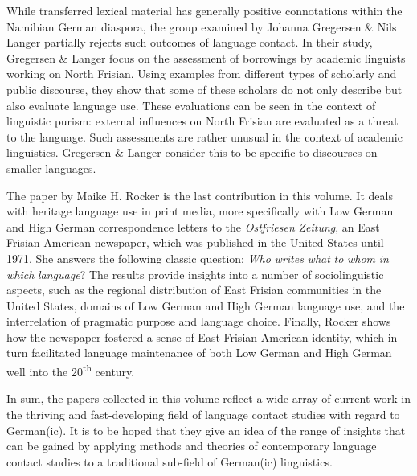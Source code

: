 \documentclass[output=paper]{langsci/langscibook}
\begin{document}
While transferred lexical material has generally positive connotations within the Namibian German diaspora, the group examined by {Johanna} {Gregersen} {\&}  {Nils} {Langer} partially rejects such outcomes of language contact. In their study, Gregersen \& Langer focus on the assessment of borrowings by academic linguists working on North Frisian. Using examples from different types of scholarly and public discourse, they show that some of these scholars do not only describe but also evaluate language use. These evaluations can be seen in the context of linguistic purism: external influences on North Frisian are evaluated as a threat to the language. Such assessments are rather unusual in the context of academic linguistics. Gregersen \& Langer consider this to be specific to discourses on smaller languages.

The paper by {Maike} {H.} {Rocker} is the last contribution in this volume. It deals with heritage language use in print media, more specifically with Low German and High German correspondence letters to the \textit{Ostfriesen} \textit{Zeitung}, an East Frisian-American newspaper, which was published in the United States until 1971. She answers the following classic question: \textit{Who} \textit{writes} \textit{what} \textit{to} \textit{whom} \textit{in} \textit{which} \textit{language}? The results provide insights into a number of sociolinguistic aspects, such as the regional distribution of East Frisian communities in the United States, domains of Low German and High German language use, and the interrelation of pragmatic purpose and language choice. Finally, Rocker shows how the newspaper fostered a sense of East Frisian-American identity, which in turn facilitated language maintenance of both Low German and High German well into the 20\textsuperscript{th} century.

In sum, the papers collected in this volume reflect a wide array of current work in the thriving and fast-developing field of language contact studies with regard to German(ic). It is to be hoped that they give an idea of the range of insights that can be gained by applying methods and theories of contemporary language contact studies to a traditional sub-field of German(ic) linguistics.



{\sloppy\printbibliography[heading=subbibliography,notkeyword=this]}
\end{document}
